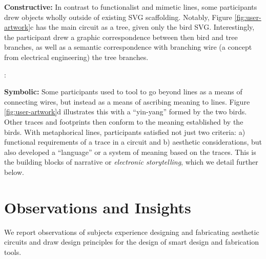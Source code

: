 \documentclass{sigchi}
\begin{document}
  \textbf{Constructive:} In contrast to functionalist and mimetic lines, some participants drew objects wholly outside of existing SVG scaffolding. Notably, Figure \ref{fig:user-artwork}c has the main circuit as a tree, given only the bird SVG. Interestingly, the participant drew a graphic correspondence between then bird and tree branches, as well as a semantic correspondence with branching wire (a concept from electrical engineering) the tree branches.

  \begin{myquote}
  \vspace{-2pt}
    :
    \vspace{-2pt}
  \end{myquote}
  
  \textbf{Symbolic:} Some participants used to tool to go beyond lines as a means of connecting wires, but instead as a means of ascribing meaning to lines. Figure \ref{fig:user-artwork}d illustrates this with a ``yin-yang'' formed by the two birds. Other traces and footprints then conform to the meaning established by the birds. With metaphorical lines, participants satisfied not just two criteria: a) functional requirements of a trace in a circuit and b) aesthetic considerations, but also developed a ``language'' or a system of meaning based on the traces.
  This is the building blocks of narrative or \textit{electronic storytelling}, which we detail further below.
 

\section{Observations and Insights}
  We report observations of subjects experience designing and fabricating aesthetic circuits and draw design principles for the design of smart design and fabrication tools. 
  
\end{document}
